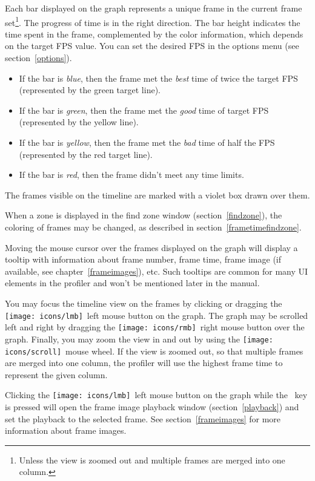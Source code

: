 \documentclass[hidelinks,titlepage,a4paper,twoside]{article}
\newcommand{\LMB}{\texttt{[image: icons/lmb]}}
\newcommand{\RMB}{\texttt{[image: icons/rmb]}}
\newcommand{\Scroll}{\texttt{[image: icons/scroll]}}
\begin{document}
Each bar displayed on the graph represents a unique frame in the current frame set\footnote{Unless the view is zoomed out and multiple frames are merged into one column.}. The progress of time is in the right direction. The bar height indicates the time spent in the frame, complemented by the color information, which depends on the target FPS value. You can set the desired FPS in the options menu (see section~\ref{options}).

\begin{itemize}
\item If the bar is \emph{blue}, then the frame met the \emph{best} time of twice the target FPS (represented by the green target line).
\item If the bar is \emph{green}, then the frame met the \emph{good} time of target FPS (represented by the yellow line).
\item If the bar is \emph{yellow}, then the frame met the \emph{bad} time of half the FPS (represented by the red target line).
\item If the bar is \emph{red}, then the frame didn't meet any time limits.
\end{itemize}

The frames visible on the timeline are marked with a violet box drawn over them.

When a zone is displayed in the find zone window (section~\ref{findzone}), the coloring of frames may be changed, as described in section~\ref{frametimefindzone}.

Moving the \faMousePointer{} mouse cursor over the frames displayed on the graph will display a tooltip with information about frame number, frame time, frame image (if available, see chapter~\ref{frameimages}), etc. Such tooltips are common for many UI elements in the profiler and won't be mentioned later in the manual.

You may focus the timeline view on the frames by clicking or dragging the \LMB{}~left mouse button on the graph. The graph may be scrolled left and right by dragging the \RMB{}~right mouse button over the graph. Finally, you may zoom the view in and out by using the \Scroll{}~mouse wheel. If the view is zoomed out, so that multiple frames are merged into one column, the profiler will use the highest frame time to represent the given column.

Clicking the \LMB{}~left mouse button on the graph while the \keys{\ctrl}~key is pressed will open the frame image playback window (section~\ref{playback}) and set the playback to the selected frame. See section~\ref{frameimages} for more information about frame images.
\end{document}
